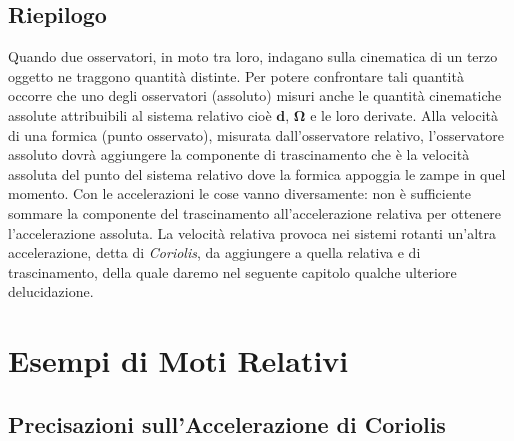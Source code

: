 \section{Riepilogo}

\noindent  Quando due osservatori,
in moto tra loro, indagano sulla cinematica di un terzo oggetto ne traggono
quantit\`a distinte. Per potere confrontare tali quantit\`a occorre che uno degli
osservatori (assoluto) misuri anche le quantit\`a cinematiche assolute
attribuibili al sistema relativo cio\`e
$\bm d$, $\bm \Omega$ e le loro derivate.
Alla velocit\`a di una formica (punto osservato), misurata dall'osservatore
relativo, l'osservatore assoluto dovr\`a aggiungere la componente di trascinamento
che \`e la velocit\`a assoluta del punto del sistema relativo dove la formica appoggia le 
zampe in quel momento.
Con le accelerazioni le cose vanno diversamente: non \`e sufficiente sommare la componente
del trascinamento all'accelerazione relativa per ottenere l'accelerazione assoluta. La
velocit\`a relativa provoca nei sistemi rotanti un'altra accelerazione,
detta di {\em Coriolis}, da aggiungere a quella relativa e di trascinamento, della quale
daremo nel seguente capitolo qualche ulteriore delucidazione.
\newpage
\thispagestyle{empty}
\null

\chapter{Esempi di Moti Relativi}

\section{Precisazioni sull'Accelerazione di Coriolis} 

